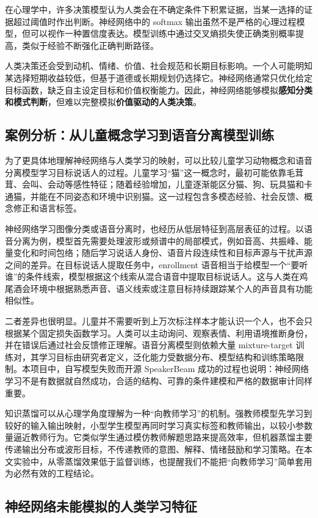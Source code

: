 \documentclass[UTF8,zihao=5,a4paper]{ctexart}
\begin{document}
在心理学中，许多决策模型认为人类会在不确定条件下积累证据，当某一选择的证据超过阈值时作出判断。神经网络中的 softmax 输出虽然不是严格的心理过程模型，但可以视作一种置信度表达。模型训练中通过交叉熵损失使正确类别概率提高，类似于经验不断强化正确判断路径。

人类决策还会受到动机、情绪、价值、社会规范和长期目标影响。一个人可能明知某选择短期收益较低，但基于道德或长期规划仍选择它。神经网络通常只优化给定目标函数，缺乏自主设定目标和价值权衡能力。因此，神经网络能够模拟\textbf{感知分类和模式判断}，但难以完整模拟\textbf{价值驱动的人类决策}。

\subsection{案例分析：从儿童概念学习到语音分离模型训练}

为了更具体地理解神经网络与人类学习的映射，可以比较儿童学习动物概念和语音分离模型学习目标说话人的过程。儿童学习“猫”这一概念时，最初可能依靠毛茸茸、会叫、会动等感性特征；随着经验增加，儿童逐渐能区分猫、狗、玩具猫和卡通猫，并能在不同姿态和环境中识别猫。这一过程包含多模态经验、社会反馈、概念修正和语言标签。

神经网络学习图像分类或语音分离时，也经历从低层特征到高层表征的过程。以语音分离为例，模型首先需要处理波形或频谱中的局部模式，例如音高、共振峰、能量变化和时间包络；随后学习说话人身份、语音片段连续性和目标声源与干扰声源之间的差异。在目标说话人提取任务中，enrollment 语音相当于给模型一个“要听谁”的条件线索，模型根据这个线索从混合语音中提取目标说话人。这与人类在鸡尾酒会环境中根据熟悉声音、语义线索或注意目标持续跟踪某个人的声音具有功能相似性。

二者差异也很明显。儿童并不需要听到上万次标注样本才能认识一个人，也不会只根据某个固定损失函数学习。人类可以主动询问、观察表情、利用语境推断身份，并在错误后通过社会反馈修正理解。语音分离模型则依赖大量 mixture-target 训练对，其学习目标由研究者定义，泛化能力受数据分布、模型结构和训练策略限制。本项目中，自写模型失败而开源 SpeakerBeam 成功的过程也说明：神经网络学习不是有数据就自然成功，合适的结构、可靠的条件建模和严格的数据审计同样重要。

知识蒸馏可以从心理学角度理解为一种“向教师学习”的机制。强教师模型先学习到较好的输入输出映射，小型学生模型再同时学习真实标签和教师输出，以较小参数量逼近教师行为。它类似学生通过模仿教师解题思路来提高效率，但机器蒸馏主要传递输出分布或波形目标，不传递教师的意图、解释、情绪鼓励和学习策略。在本文实验中，从零蒸馏效果低于监督训练，也提醒我们不能把“向教师学习”简单套用为必然有效的工程结论。

\subsection{神经网络未能模拟的人类学习特征}
\end{document}
